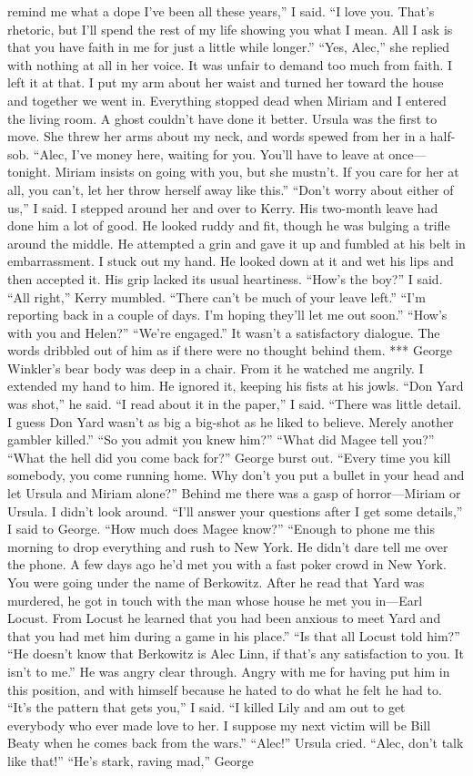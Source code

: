 \documentclass{novel}
\begin{document}
remind me what a dope I’ve been all these years,” I said. “I love you. That’s rhetoric, but I’ll spend the rest of my life showing you what I mean. All I ask is that you have faith in me for just a little while longer.” “Yes, Alec,” she replied with nothing at all in her voice. It was unfair to demand too much from faith. I left it at that. I put my arm about her waist and turned her toward the house and together we went in. Everything stopped dead when Miriam and I entered the living room. A ghost couldn’t have done it better. Ursula was the first to move. She threw her arms about my neck, and words spewed from her in a half-sob. “Alec, I’ve money here, waiting for you. You’ll have to leave at once—tonight. Miriam insists on going with you, but she mustn’t. If you care for her at all, you can’t, let her throw herself away like this.” “Don’t worry about either of us,” I said. I stepped around her and over to Kerry. His two-month leave had done him a lot of good. He looked ruddy and fit, though he was bulging a trifle around the middle. He attempted a grin and gave it up and fumbled at his belt in embarrassment. I stuck out my hand. He looked down at it and wet his lips and then accepted it. His grip lacked its usual heartiness. “How’s the boy?” I said. “All right,” Kerry mumbled. “There can’t be much of your leave left.” “I’m reporting back in a couple of days. I’m hoping they’ll let me out soon.” “How’s with you and Helen?” “We’re engaged.” It wasn’t a satisfactory dialogue. The words dribbled out of him as if there were no thought behind them. *** George Winkler’s bear body was deep in a chair. From it he watched me angrily. I extended my hand to him. He ignored it, keeping his fists at his jowls. “Don Yard was shot,” he said. “I read about it in the paper,” I said. “There was little detail. I guess Don Yard wasn’t as big a big-shot as he liked to believe. Merely another gambler killed.” “So you admit you knew him?” “What did Magee tell you?” “What the hell did you come back for?” George burst out. “Every time you kill somebody, you come running home. Why don’t you put a bullet in your head and let Ursula and Miriam alone?” Behind me there was a gasp of horror—Miriam or Ursula. I didn’t look around. “I’ll answer your questions after I get some details,” I said to George. “How much does Magee know?” “Enough to phone me this morning to drop everything and rush to New York. He didn’t dare tell me over the phone. A few days ago he’d met you with a fast poker crowd in New York. You were going under the name of Berkowitz. After he read that Yard was murdered, he got in touch with the man whose house he met you in—Earl Locust. From Locust he learned that you had been anxious to meet Yard and that you had met him during a game in his place.” “Is that all Locust told him?” “He doesn’t know that Berkowitz is Alec Linn, if that’s any satisfaction to you. It isn’t to me.” He was angry clear through. Angry with me for having put him in this position, and with himself because he hated to do what he felt he had to. “It’s the pattern that gets you,” I said. “I killed Lily and am out to get everybody who ever made love to her. I suppose my next victim will be Bill Beaty when he comes back from the wars.” “Alec!” Ursula cried. “Alec, don’t talk like that!” “He’s stark, raving mad,” George 
\end{document}
